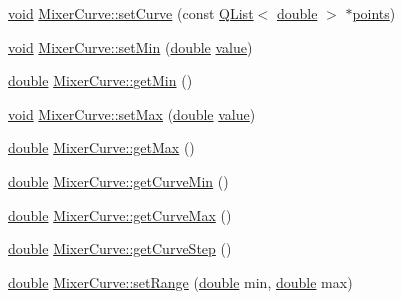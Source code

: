 \begin{DoxyCompactItemize}
\item 
\hyperlink{group___u_a_v_objects_plugin_ga444cf2ff3f0ecbe028adce838d373f5c}{void} \hyperlink{group___config_plugin_ga0292ee7413de63e428fd0ca9ec2d0f08}{Mixer\-Curve\-::set\-Curve} (const \hyperlink{class_q_list}{Q\-List}$<$ \hyperlink{_super_l_u_support_8h_a8956b2b9f49bf918deed98379d159ca7}{double} $>$ $\ast$\hyperlink{glext_8h_ae75d9f560170dfeaadc8718c87f5fbec}{points})
\item 
\hyperlink{group___u_a_v_objects_plugin_ga444cf2ff3f0ecbe028adce838d373f5c}{void} \hyperlink{group___config_plugin_gae709bb34fd5b4386c7538059fd77e523}{Mixer\-Curve\-::set\-Min} (\hyperlink{_super_l_u_support_8h_a8956b2b9f49bf918deed98379d159ca7}{double} \hyperlink{glext_8h_aa0e2e9cea7f208d28acda0480144beb0}{value})
\item 
\hyperlink{_super_l_u_support_8h_a8956b2b9f49bf918deed98379d159ca7}{double} \hyperlink{group___config_plugin_ga6d107a62e8f6d1115afbe9869d5fbf62}{Mixer\-Curve\-::get\-Min} ()
\item 
\hyperlink{group___u_a_v_objects_plugin_ga444cf2ff3f0ecbe028adce838d373f5c}{void} \hyperlink{group___config_plugin_ga122781733f46efdca9586ab7d1cb46e3}{Mixer\-Curve\-::set\-Max} (\hyperlink{_super_l_u_support_8h_a8956b2b9f49bf918deed98379d159ca7}{double} \hyperlink{glext_8h_aa0e2e9cea7f208d28acda0480144beb0}{value})
\item 
\hyperlink{_super_l_u_support_8h_a8956b2b9f49bf918deed98379d159ca7}{double} \hyperlink{group___config_plugin_ga218856c51ab9ecff11ecfcf0f6074589}{Mixer\-Curve\-::get\-Max} ()
\item 
\hyperlink{_super_l_u_support_8h_a8956b2b9f49bf918deed98379d159ca7}{double} \hyperlink{group___config_plugin_gae8aad43963c9ca3ce7412e3f8f023e84}{Mixer\-Curve\-::get\-Curve\-Min} ()
\item 
\hyperlink{_super_l_u_support_8h_a8956b2b9f49bf918deed98379d159ca7}{double} \hyperlink{group___config_plugin_ga00f0ef17d7a211c8cfa37feb02cc032c}{Mixer\-Curve\-::get\-Curve\-Max} ()
\item 
\hyperlink{_super_l_u_support_8h_a8956b2b9f49bf918deed98379d159ca7}{double} \hyperlink{group___config_plugin_ga2f4e12f8e1036a490fe9846548bcb197}{Mixer\-Curve\-::get\-Curve\-Step} ()
\item 
\hyperlink{_super_l_u_support_8h_a8956b2b9f49bf918deed98379d159ca7}{double} \hyperlink{group___config_plugin_ga7cd12492effe33f54cbbbc2eed7a5acb}{Mixer\-Curve\-::set\-Range} (\hyperlink{_super_l_u_support_8h_a8956b2b9f49bf918deed98379d159ca7}{double} min, \hyperlink{_super_l_u_support_8h_a8956b2b9f49bf918deed98379d159ca7}{double} max)

\end{DoxyCompactItemize}
